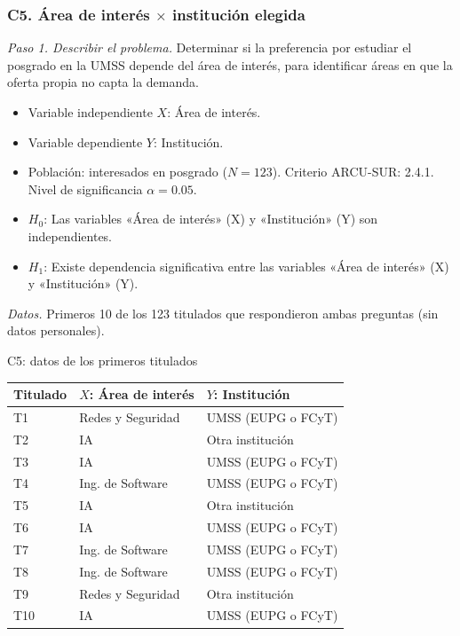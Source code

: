 \subsubsection*{C5. Área de interés $\times$ institución elegida}

\textit{Paso 1. Describir el problema.} Determinar si la preferencia por estudiar el posgrado en la UMSS depende del área de interés, para identificar áreas en que la oferta propia no capta la demanda.

\begin{itemize}[nosep]
  \item Variable independiente $X$: Área de interés.
  \item Variable dependiente $Y$: Institución.
  \item Población: interesados en posgrado ($N = 123$). Criterio ARCU-SUR: 2.4.1. Nivel de significancia $\alpha = 0.05$.
  \item $H_0$: Las variables «Área de interés» (X) y «Institución» (Y) son independientes.
  \item $H_1$: Existe dependencia significativa entre las variables «Área de interés» (X) y «Institución» (Y).
\end{itemize}

\textit{Datos.} Primeros 10 de los 123 titulados que respondieron ambas preguntas (sin datos personales).

\begin{mitabla}{C5: datos de los primeros titulados}
\begin{tabular}{lll}
\toprule
Titulado & $X$: Área de interés & $Y$: Institución \\
\midrule
T1 & Redes y Seguridad & UMSS (EUPG o FCyT) \\
T2 & IA & Otra institución \\
T3 & IA & UMSS (EUPG o FCyT) \\
T4 & Ing. de Software & UMSS (EUPG o FCyT) \\
T5 & IA & Otra institución \\
T6 & IA & UMSS (EUPG o FCyT) \\
T7 & Ing. de Software & UMSS (EUPG o FCyT) \\
T8 & Ing. de Software & UMSS (EUPG o FCyT) \\
T9 & Redes y Seguridad & Otra institución \\
T10 & IA & UMSS (EUPG o FCyT) \\
\bottomrule
\end{tabular}
\end{mitabla}

